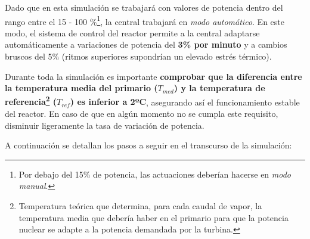 Dado que en esta simulación se trabajará con valores de potencia dentro del rango entre el 15 - 100 \%\footnote{Por debajo del 15\% de potencia, las actuaciones deberían hacerse en \textit{modo manual}.}, la central trabajará en \textit{modo automático}. En este modo, el sistema de control del reactor permite a la central adaptarse automáticamente a variaciones de potencia del \textbf{3\% por minuto} y a cambios bruscos del 5\% (ritmos superiores supondrían un elevado estrés térmico). 

Durante toda la simulación es importante \textbf{comprobar que la diferencia entre la temperatura media del primario ($T_{med}$) y la temperatura de referencia\footnote{Temperatura teórica que determina, para cada caudal de vapor, la temperatura media que debería haber en el primario para que la potencia nuclear se adapte a la potencia demandada por la turbina.} ($T_{ref}$) es inferior a 2ºC}, asegurando así el funcionamiento estable del reactor. En caso de que en algún momento no se cumpla este requisito, disminuir ligeramente la tasa de variación de potencia.

A continuación se detallan los pasos a seguir en el transcurso de la simulación:

